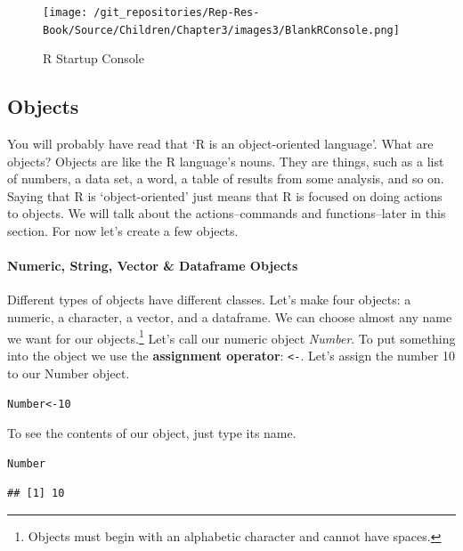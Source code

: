 \documentclass[ChapterTOCs,krantz1]{krantz}\usepackage{graphicx, color}
\makeatletter
\newenvironment{kframe}{%
 \def\at@end@of@kframe{}%
 \ifinner\ifhmode%
  \def\at@end@of@kframe{\end{minipage}}%
  \begin{minipage}{\columnwidth}%
 \fi\fi%
 \def\FrameCommand##1{\hskip\@totalleftmargin \hskip-\fboxsep
 \colorbox{shadecolor}{##1}\hskip-\fboxsep
     \hskip-\linewidth \hskip-\@totalleftmargin \hskip\columnwidth}%
 \MakeFramed {\advance\hsize-\width
   \@totalleftmargin\z@ \linewidth\hsize
   \@setminipage}}%
 {\par\unskip\endMakeFramed%
 \at@end@of@kframe}
\newenvironment{knitrout}{}{} %
\makeatother
\begin{document}
\begin{figure}[th!]
    \caption{R Startup Console}
    \label{RBlankMain}
    \begin{center}
    \texttt{[image: /git\_repositories/Rep-Res-Book/Source/Children/Chapter3/images3/BlankRConsole.png]}
    \end{center}
\end{figure}

\subsection{Objects}

You will probably have read that `R is an object-oriented language'.  What are objects? Objects are like the R language's nouns. They are things, such as a list of numbers, a data set, a word, a table of results from some analysis, and so on. Saying that R is `object-oriented' just means that R is focused on doing actions to objects. We will talk about the actions--commands and functions--later in this section. For now let's create a few objects.

\paragraph{Numeric, String, Vector \& Dataframe Objects}

Different types of objects have different classes. Let's make four objects: a numeric, a character, a vector, and a dataframe. We can choose almost any name we want for our objects.\footnote{Objects must begin with an alphabetic character and cannot have spaces.} Let's call our numeric object {\emph{Number}}. To put something into the object we use the {\bf{assignment operator}}: {\tt{\textless -}}. Let's assign the number 10 to our Number object.

\begin{knitrout}
\color{fgcolor}\begin{kframe}
\begin{alltt}
Number <- 10
\end{alltt}
\end{kframe}
\end{knitrout}


\noindent To see the contents of our object, just type its name.

\begin{knitrout}
\color{fgcolor}\begin{kframe}
\begin{alltt}
Number
\end{alltt}
\begin{verbatim}
## [1] 10
\end{verbatim}
\end{kframe}
\end{knitrout}
\end{document}
